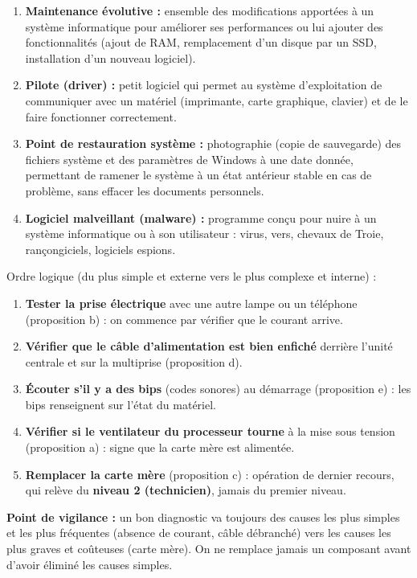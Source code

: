 \documentclass[11pt]{article}
\begin{document}
\begin{corrige}
\begin{enumerate}
    \item \textbf{Maintenance évolutive :} ensemble des modifications apportées à un système informatique pour améliorer ses performances ou lui ajouter des fonctionnalités (ajout de RAM, remplacement d'un disque par un SSD, installation d'un nouveau logiciel).
    \item \textbf{Pilote (driver) :} petit logiciel qui permet au système d'exploitation de communiquer avec un matériel (imprimante, carte graphique, clavier) et de le faire fonctionner correctement.
    \item \textbf{Point de restauration système :} photographie (copie de sauvegarde) des fichiers système et des paramètres de Windows à une date donnée, permettant de ramener le système à un état antérieur stable en cas de problème, sans effacer les documents personnels.
    \item \textbf{Logiciel malveillant (malware) :} programme conçu pour nuire à un système informatique ou à son utilisateur : virus, vers, chevaux de Troie, rançongiciels, logiciels espions.
\end{enumerate}
\end{corrige}

\begin{corrige}
Ordre logique (du plus simple et externe vers le plus complexe et interne) :
\begin{enumerate}
    \item[\textbf{1.}] \textbf{Tester la prise électrique} avec une autre lampe ou un téléphone (proposition b) : on commence par vérifier que le courant arrive.
    \item[\textbf{2.}] \textbf{Vérifier que le câble d'alimentation est bien enfiché} derrière l'unité centrale et sur la multiprise (proposition d).
    \item[\textbf{3.}] \textbf{Écouter s'il y a des bips} (codes sonores) au démarrage (proposition e) : les bips renseignent sur l'état du matériel.
    \item[\textbf{4.}] \textbf{Vérifier si le ventilateur du processeur tourne} à la mise sous tension (proposition a) : signe que la carte mère est alimentée.
    \item[\textbf{5.}] \textbf{Remplacer la carte mère} (proposition c) : opération de dernier recours, qui relève du \textbf{niveau 2 (technicien)}, jamais du premier niveau.
\end{enumerate}

\textbf{Point de vigilance :} un bon diagnostic va toujours des causes les plus simples et les plus fréquentes (absence de courant, câble débranché) vers les causes les plus graves et coûteuses (carte mère). On ne remplace jamais un composant avant d'avoir éliminé les causes simples.
\end{corrige}
\end{document}
